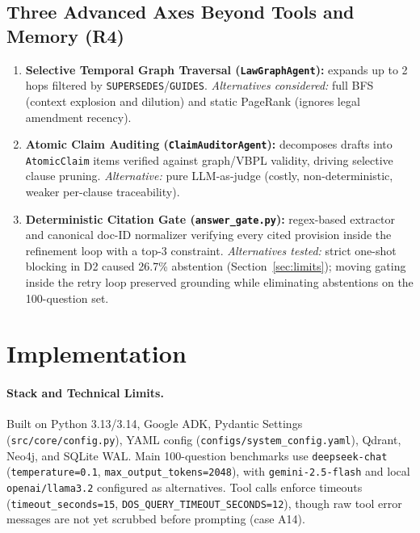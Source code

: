 \documentclass[sigconf,nonacm]{acmart}
\begin{document}
\subsection{Three Advanced Axes Beyond Tools and Memory (R4)}
\begin{enumerate}[leftmargin=*]
  \item \textbf{Selective Temporal Graph Traversal (\texttt{LawGraphAgent}):} expands up to 2 hops filtered by \texttt{SUPERSEDES}/\texttt{GUIDES}. \emph{Alternatives considered:} full BFS (context explosion and dilution) and static PageRank (ignores legal amendment recency).
  \item \textbf{Atomic Claim Auditing (\texttt{ClaimAuditorAgent}):} decomposes drafts into \texttt{AtomicClaim} items verified against graph/VBPL validity, driving selective clause pruning. \emph{Alternative:} pure LLM-as-judge (costly, non-deterministic, weaker per-clause traceability).
  \item \textbf{Deterministic Citation Gate (\texttt{answer\_gate.py}):} regex-based extractor and canonical doc-ID normalizer verifying every cited provision inside the refinement loop with a top-3 constraint. \emph{Alternatives tested:} strict one-shot blocking in D2 caused 26.7\% abstention (Section~\ref{sec:limits}); moving gating inside the retry loop preserved grounding while eliminating abstentions on the 100-question set.
\end{enumerate}

\section{Implementation}
\label{sec:impl}

\paragraph{Stack and Technical Limits.}
Built on Python 3.13/3.14, Google ADK, Pydantic Settings (\texttt{src/core/config.py}), YAML config (\texttt{configs/system\_config.yaml}), Qdrant, Neo4j, and SQLite WAL. Main 100-question benchmarks use \texttt{deepseek-chat} (\texttt{temperature=0.1}, \texttt{max\_output\_tokens=2048}), with \texttt{gemini-2.5-flash} and local \texttt{openai/llama3.2} configured as alternatives. Tool calls enforce timeouts (\texttt{timeout\_seconds=15}, \texttt{DOS\_QUERY\_TIMEOUT\_SECONDS=12}), though raw tool error messages are not yet scrubbed before prompting (case A14).
\end{document}
